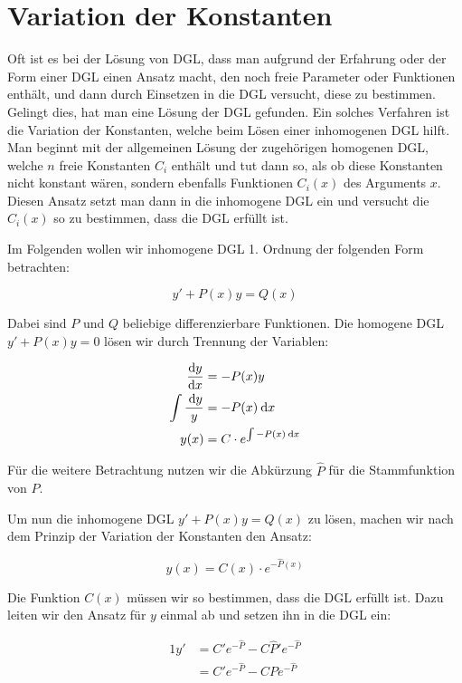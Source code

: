 \section{Variation der Konstanten}

Oft ist es bei der Lösung von DGL, dass man aufgrund der Erfahrung oder der Form einer DGL einen Ansatz macht, den noch freie Parameter oder Funktionen enthält, und dann durch Einsetzen in die DGL versucht, diese zu bestimmen. Gelingt dies, hat man eine Lösung der DGL gefunden. Ein solches Verfahren ist die Variation der Konstanten, welche beim Lösen einer inhomogenen DGL hilft. Man beginnt mit der allgemeinen Lösung der zugehörigen homogenen DGL, welche $n$ freie Konstanten $C_i$ enthält und tut dann so, als ob diese Konstanten nicht konstant wären, sondern ebenfalls Funktionen $C_i(x)$ des Arguments $x$. Diesen Ansatz setzt man dann in die inhomogene DGL ein und versucht die $C_i(x)$ so zu bestimmen, dass die DGL erfüllt ist.

Im Folgenden wollen wir inhomogene DGL 1. Ordnung der folgenden Form betrachten:

$$
    y'+P(x)y=Q(x)
$$

Dabei sind $P$ und $Q$ beliebige differenzierbare Funktionen. Die homogene DGL $y'+P(x)y=0$ lösen wir durch Trennung der Variablen:

\begin{alignat*}{1}
    \frac{\mathrm{d}{y}}{\mathrm{d}{x}}               &= -P(x) y \\
    \int \frac{\:\mathrm{d}{y}}{y} &= -P(x) \:\mathrm{d}{x} \\
    y(x)                    &= C \cdot e^{\int -P(x) \:\mathrm{d}{x}}
\end{alignat*}

Für die weitere Betrachtung nutzen wir die Abkürzung $\hat{P}$ für die Stammfunktion von $P$.

Um nun die inhomogene DGL $y'+P(x)y=Q(x)$ zu lösen, machen wir nach dem Prinzip der Variation der Konstanten den Ansatz:

$$
    y(x) = C(x) \cdot e^{-\hat{P}(x)}
$$

Die Funktion $C(x)$ müssen wir so bestimmen, dass die DGL erfüllt ist. Dazu leiten wir den Ansatz für $y$ einmal ab und setzen ihn in die DGL ein:

\begin{alignat*}{1}
    y' &= C' e^{-\hat{P}} - C \hat{P}' e^{-\hat{P}} \\
       &= C' e^{-\hat{P}} - C P e^{-\hat{P}}
\end{alignat*}

